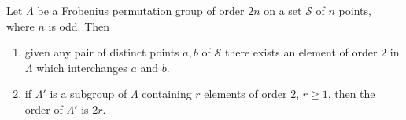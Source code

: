 Let $\Lambda$ be a Frobenius permutation group of order $2n$ on a set $\mathcal{S}$ of $n$ points, where $n$ is odd. Then

\begin{enumerate}
\item[(i)] given any pair of distinct points $a, b$ of $\mathcal{S}$ there exists an element of order $2$ in $\Lambda$ which interchanges $a$ and $b$.
\item[(ii)] if $\Lambda'$ is a subgroup of $\Lambda$ containing $r$ elements of order $2$, $r \geq 1$, then the order of $\Lambda'$ is $2r$.
\end{enumerate}
